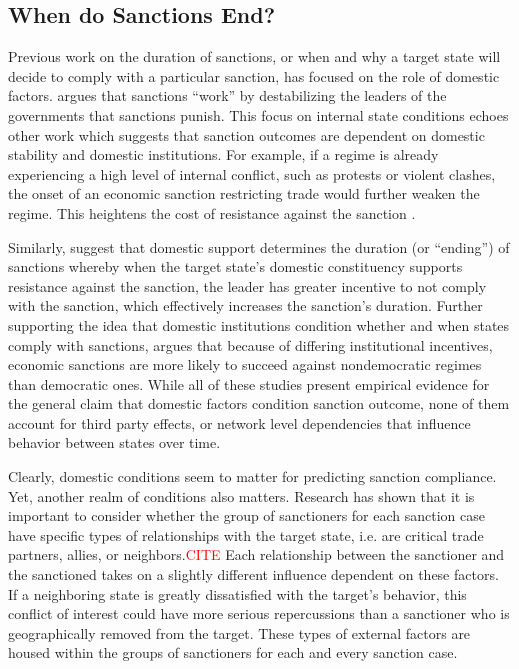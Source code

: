 \subsection*{When do Sanctions End?}
\label{lit}

Previous work on the duration of sanctions, or when and why a target state will decide to comply with a particular sanction, has focused on the role of domestic factors. \cite{marinov2005} argues that sanctions ``work'' by destabilizing the leaders of the governments that sanctions punish. This focus on internal state conditions echoes other work which suggests that sanction outcomes are dependent on domestic stability and domestic institutions. For example, if a regime is already experiencing a high level of internal conflict, such as protests or violent clashes, the onset of an economic sanction restricting trade would further weaken the regime. This heightens the cost of resistance against the sanction \citep{dashti1997}. 

Similarly, \citep{dorussen2001} suggest that domestic support determines the duration (or ``ending'') of sanctions whereby when the target state's domestic constituency supports resistance against the sanction, the leader has greater incentive to not comply with the sanction, which effectively increases the sanction's duration. Further supporting the idea that domestic institutions condition whether and when states comply with sanctions, \cite{lektzian2007} argues that because of differing institutional incentives, economic sanctions are more likely to succeed against nondemocratic regimes than democratic ones. While all of these studies present empirical evidence for the general claim that domestic factors condition sanction outcome, none of them account for third party effects, or network level dependencies that influence behavior between states over time. 

Clearly, domestic conditions seem to matter for predicting sanction compliance. Yet, another realm of conditions also matters. Research has shown that it is important to consider whether the group of sanctioners for each sanction case have specific types of relationships with the target state, i.e. are critical trade partners, allies, or neighbors.\textcolor{red}{CITE} Each relationship between the sanctioner and the sanctioned takes on a slightly different influence dependent on these factors. If a neighboring state is greatly dissatisfied with the target's behavior, this conflict of interest could have more serious repercussions than a sanctioner who is geographically removed from the target. These types of external factors are housed within the groups of sanctioners for each and every sanction case. 

